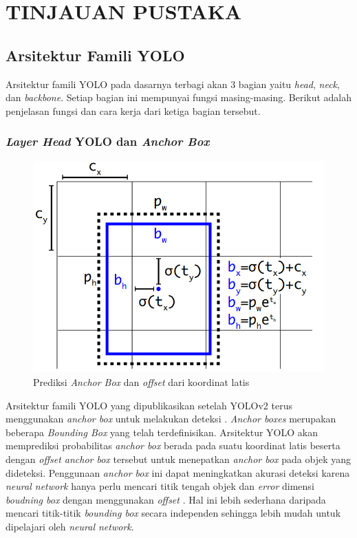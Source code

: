 \section{TINJAUAN PUSTAKA}
\subsection{Arsitektur Famili YOLO}
  Arsitektur famili YOLO pada dasarnya terbagi akan 3 bagian yaitu \emph{head}, \emph{neck}, dan \emph{backbone}.
  Setiap bagian ini mempunyai fungsi masing-masing.
  Berikut adalah penjelasan fungsi dan cara kerja dari ketiga bagian tersebut.
  \subsubsection{\emph{Layer Head} YOLO dan \emph{Anchor Box}}
    \begin{figure}[ht]
        \centering
        \includegraphics[scale=0.4]{pictures/anchorbox.png}
        \caption{Prediksi \emph{Anchor Box} dan \emph{offset} dari koordinat latis \parencite{yolov3}}
        \label{fig:anchorbox}
    \end{figure}
    Arsitektur famili YOLO yang dipublikasikan setelah YOLOv2 terus menggunakan \emph{anchor box} untuk melakukan deteksi \parencites{yolov2}{yolov3}{yolov4}{scaledyolov4}{yolov5}{yolor}{yolov7}.
    \emph{Anchor boxes} merupakan beberapa \emph{Bounding Box} yang telah terdefinisikan. 
    Arsitektur YOLO akan memprediksi probabilitas \emph{anchor box} berada pada suatu koordinat latis beserta dengan \emph{offset anchor box} tersebut untuk menepatkan \emph{anchor box} pada objek yang dideteksi.
    Penggunaan \emph{anchor box} ini dapat meningkatkan akurasi deteksi karena \emph{neural network} hanya perlu mencari titik tengah objek dan \emph{error} dimensi \emph{boudning box} dengan menggunakan \emph{offset} \parencite{yolov3}.
    Hal ini lebih sederhana daripada mencari titik-titik \emph{bounding box} secara independen sehingga lebih mudah untuk dipelajari oleh \emph{neural network}.

